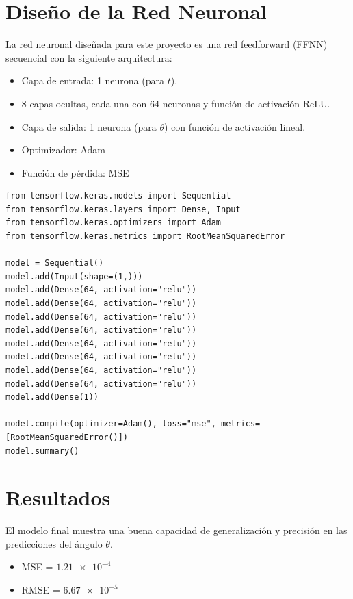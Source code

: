 \documentclass[a4paper,12pt]{article}
\begin{document}
\section{Diseño de la Red Neuronal}
La red neuronal diseñada para este proyecto es una red feedforward (FFNN) secuencial con la siguiente arquitectura:
\begin{itemize}
    \item Capa de entrada: 1 neurona (para \(t\)).
    \item 8 capas ocultas, cada una con 64 neuronas y función de activación ReLU.
    \item Capa de salida: 1 neurona (para \(\theta\)) con función de activación lineal.
    \item Optimizador: Adam
    \item Función de pérdida: MSE
\end{itemize}

\begin{verbatim}
from tensorflow.keras.models import Sequential
from tensorflow.keras.layers import Dense, Input
from tensorflow.keras.optimizers import Adam
from tensorflow.keras.metrics import RootMeanSquaredError

model = Sequential()
model.add(Input(shape=(1,)))
model.add(Dense(64, activation="relu"))
model.add(Dense(64, activation="relu"))
model.add(Dense(64, activation="relu"))
model.add(Dense(64, activation="relu"))
model.add(Dense(64, activation="relu"))
model.add(Dense(64, activation="relu"))
model.add(Dense(64, activation="relu"))
model.add(Dense(64, activation="relu"))
model.add(Dense(1))

model.compile(optimizer=Adam(), loss="mse", metrics=[RootMeanSquaredError()])
model.summary()
\end{verbatim}

\section{Resultados}
El modelo final muestra una buena capacidad de generalización y precisión en las predicciones del ángulo \(\theta\).
\begin{itemize}
    \item MSE = \(\qty{1.21e-4}{}\)
    \item RMSE = \(\qty{6.67e-5}{}\)
\end{itemize}
\end{document}
